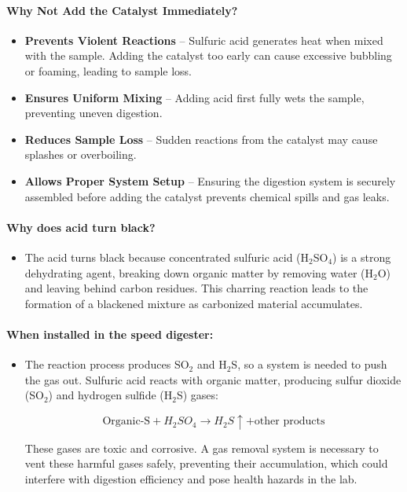 \documentclass[hidelinks]{report}
\begin{document}
            \paragraph{Why Not Add the Catalyst Immediately?}
            \begin{itemize}
                \item \textbf{Prevents Violent Reactions} – Sulfuric acid generates heat when mixed with the sample. Adding the catalyst too early can cause excessive bubbling or foaming, leading to sample loss.
                \item \textbf{Ensures Uniform Mixing} – Adding acid first fully wets the sample, preventing uneven digestion.
                \item \textbf{Reduces Sample Loss} – Sudden reactions from the catalyst may cause splashes or overboiling.
                \item \textbf{Allows Proper System Setup} – Ensuring the digestion system is securely assembled before adding the catalyst prevents chemical spills and gas leaks.
            \end{itemize}
            
            \paragraph{Why does acid turn black?}
            \begin{itemize}
                \item The acid turns black because concentrated sulfuric acid (H$_2$SO$_4$) is a strong dehydrating agent, breaking down organic matter by removing water (H$_2$O) and leaving behind carbon residues. This charring reaction leads to the formation of a blackened mixture as carbonized material accumulates.
            \end{itemize}
            
            \paragraph{When installed in the speed digester:}
            \begin{itemize}
                \item The reaction process produces SO$_2$ and H$_2$S, so a system is needed to push the gas out. Sulfuric acid reacts with organic matter, producing sulfur dioxide (SO$_2$) and hydrogen sulfide (H$_2$S) gases:
            
                \[
                \text{Organic-S} + H_2SO_4 \rightarrow H_2S\uparrow + \text{other products}
                \]
                
                These gases are toxic and corrosive. A gas removal system is necessary to vent these harmful gases safely, preventing their accumulation, which could interfere with digestion efficiency and pose health hazards in the lab.
            \end{itemize}
            
\end{document}
